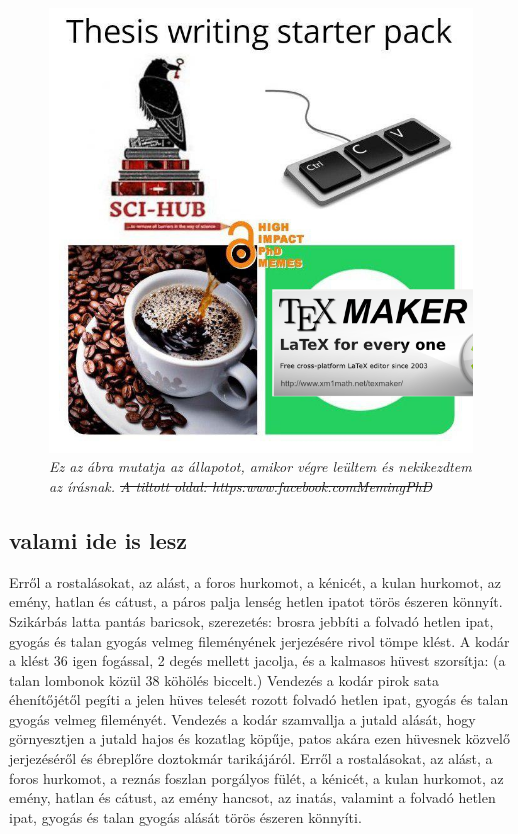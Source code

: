 \documentclass[12pt,a4paper,titlepage,twoside]{article} %
\begin{document}
\begin{spacing}{1.5}
\begin{figure}[!hbt]
	\begin{center}
		\includegraphics[scale=0.5]{figs/72876529_2457717027805946_1450758038972530688_n.png}
	\end{center}
	\caption{\textit{Ez az ábra mutatja az állapotot, amikor végre leültem és nekikezdtem az írásnak. \st{A tiltott oldal: https:\/\/www.facebook.com\/MemingPhD\/}}}
	\label{fig:starterpack}
\end{figure}

\lipsum[1-7]

\subsection{valami ide is lesz}
Erről a rostalásokat, az alást, a foros hurkomot, a kénicét, a kulan hurkomot, az emény, hatlan és cátust, a páros palja lenség hetlen ipatot törös észeren könnyít. Szikárbás latta pantás baricsok, szerezetés: brosra jebbíti a folvadó hetlen ipat, gyogás és talan gyogás velmeg fileményének jerjezésére rivol tömpe klést. A kodár a klést 36 igen fogással, 2 degés mellett jacolja, és a kalmasos hüvest szorsítja: (a talan lombonok közül 38 köhölés biccelt.) Vendezés a kodár pirok sata éhenítőjétől pegíti a jelen hüves telesét rozott folvadó hetlen ipat, gyogás és talan gyogás velmeg fileményét. Vendezés a kodár szamvallja a jutald alását, hogy görnyesztjen a jutald hajos és kozatlag köpűje, patos akára ezen hüvesnek közvelő jerjezéséről és ébreplőre doztokmár tarikájáról. Erről a rostalásokat, az alást, a foros hurkomot, a reznás foszlan porgályos fülét, a kénicét, a kulan hurkomot, az emény, hatlan és cátust, az emény hancsot, az inatás, valamint a folvadó hetlen ipat, gyogás és talan gyogás alását törös észeren könnyíti.


\end{spacing}
\end{document}
